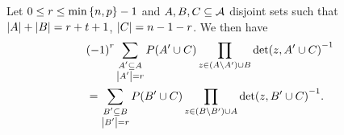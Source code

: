 \begin{lemma}\label{mds-abc-lemma}
    Let $0\leq r\leq\min\set{n,p}-1$ and $A,B,C\subseteq \mathcal{A}$ disjoint sets such
    that $\left\vert{A}\right\vert+\left\vert{B}\right\vert=r+t+1$, $\left\vert{C}\right\vert=n-1-r$. We then have
    \begin{align*}
        &{(-1)}^r\sum_{\substack{A'\subseteq A\\ \left\vert{A'}\right\vert=r}}{P(A'\cup C)\prod_{z\in (A\setminus A')\cup B}{{\det(z,A'\cup C)}^{-1}}}\\
        &= \sum_{\substack{B'\subseteq B\\ \left\vert{B'}\right\vert=r}}{P(B'\cup C)\prod_{z\in (B\setminus B')\cup A}{{\det(z,B'\cup C)}^{-1}}}\text{.}
    \end{align*}
\end{lemma}

